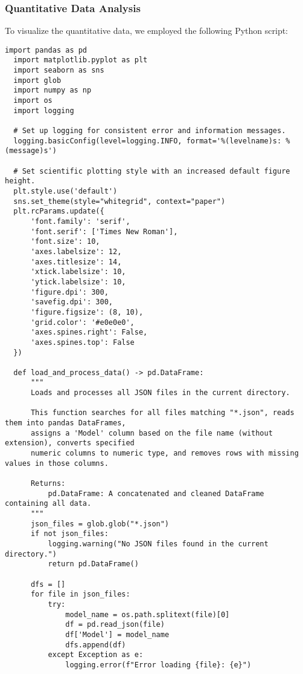 \subsubsection{Quantitative Data Analysis}

To visualize the quantitative data, we employed the following Python script:


\begin{lstlisting}[style=Python, caption={Python-quantitative-data-analysis}, captionpos=b]
  import pandas as pd
  import matplotlib.pyplot as plt
  import seaborn as sns
  import glob
  import numpy as np
  import os
  import logging
  
  # Set up logging for consistent error and information messages.
  logging.basicConfig(level=logging.INFO, format='%(levelname)s: %(message)s')
  
  # Set scientific plotting style with an increased default figure height.
  plt.style.use('default')
  sns.set_theme(style="whitegrid", context="paper")
  plt.rcParams.update({
      'font.family': 'serif',
      'font.serif': ['Times New Roman'],
      'font.size': 10,
      'axes.labelsize': 12,
      'axes.titlesize': 14,
      'xtick.labelsize': 10,
      'ytick.labelsize': 10,
      'figure.dpi': 300,
      'savefig.dpi': 300,
      'figure.figsize': (8, 10), 
      'grid.color': '#e0e0e0',
      'axes.spines.right': False,
      'axes.spines.top': False
  })
  
  def load_and_process_data() -> pd.DataFrame:
      """
      Loads and processes all JSON files in the current directory.
      
      This function searches for all files matching "*.json", reads them into pandas DataFrames,
      assigns a 'Model' column based on the file name (without extension), converts specified
      numeric columns to numeric type, and removes rows with missing values in those columns.
      
      Returns:
          pd.DataFrame: A concatenated and cleaned DataFrame containing all data.
      """
      json_files = glob.glob("*.json")
      if not json_files:
          logging.warning("No JSON files found in the current directory.")
          return pd.DataFrame()
      
      dfs = []
      for file in json_files:
          try:
              model_name = os.path.splitext(file)[0]
              df = pd.read_json(file)
              df['Model'] = model_name
              dfs.append(df)
          except Exception as e:
              logging.error(f"Error loading {file}: {e}")
      

\end{lstlisting}
